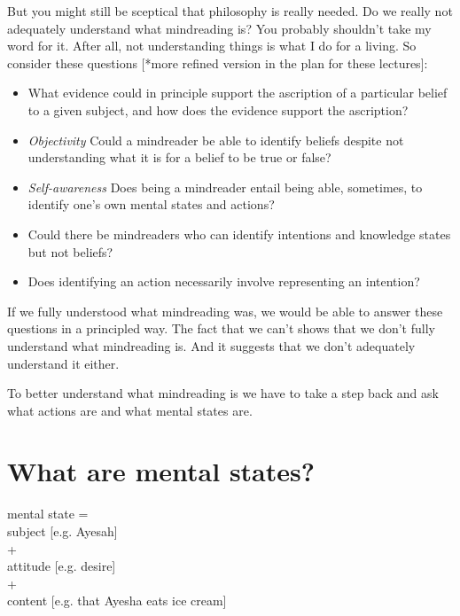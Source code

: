 \documentclass[12pt,\papersize]{extarticle}
\begin{document}
But you might still be sceptical that philosophy is really needed.  Do we really not adequately understand what mindreading is?
You probably shouldn't take my word for it.
After all, not understanding things is what I do for a living.
So consider these questions 
[*more refined version in the plan for these lectures]:
\begin{itemize}
%
\item What evidence could in principle support the ascription of a particular belief to a given subject, and how does the evidence support the ascription?
%
\item \emph{Objectivity} Could a mindreader be able to identify beliefs despite not  understanding what it is for a belief to be true or false? 
%
\item \emph{Self-awareness}  Does being a mindreader entail being able, sometimes, to identify one's own mental states and actions? 
%
\item Could there be mindreaders who can identify intentions and knowledge states but not beliefs?
%
\item Does identifying an action necessarily involve representing an intention?
%
\end{itemize}
If we fully understood what mindreading was, we would be able to answer these questions in a principled way.
The fact that we can't shows that we don't fully understand what mindreading is.
And it suggests that we don't adequately understand it either.

To better understand what mindreading is we have to take a step back and ask what actions are and what mental states are.







\section{What are mental states?}

mental state = 
	\\ \hspace*{10 mm} subject [e.g. Ayesah] 
	\\ \hspace*{10 mm} + 
	\\ \hspace*{10 mm} attitude [e.g. desire] 
	\\ \hspace*{10 mm} + 
	\\ \hspace*{10 mm} content [e.g. that Ayesha eats ice cream]
\end{document}
